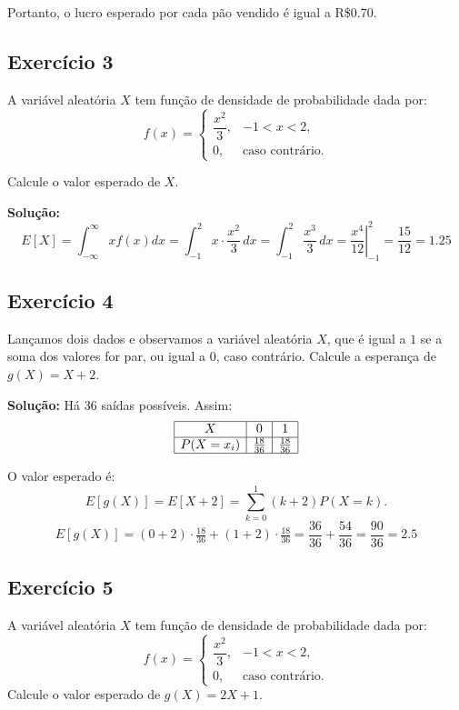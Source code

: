 \documentclass{article}
\begin{document}
Portanto, o lucro esperado por cada pão vendido é igual a R\$0.70.

\subsection{Exercício 3}
A variável aleatória $X$ tem função de densidade de probabilidade dada por:
    $$
    f(x) =
    \begin{cases}
    \dfrac{x^2}{3}, & -1 < x < 2, \\[6pt]
    0, & \text{caso contrário}.
    \end{cases}
    $$

Calcule o valor esperado de $X$.

\vspace{0.5cm}
\textbf{Solução:}
    $$
    E[X] = \int_{-\infty}^{\infty} x f(x) dx 
    = \int_{-1}^{2} x \cdot \frac{x^2}{3}\, dx
    = \int_{-1}^{2} \frac{x^3}{3}\, dx
    = \left. \frac{x^4}{12} \right|_{-1}^{2}
    = \frac{15}{12} = 1.25
    $$

\subsection{Exercício 4}
Lançamos dois dados e observamos a variável aleatória $X$, que é igual a $1$ se a soma dos valores for par, ou igual a $0$, caso contrário.  
Calcule a esperança de $g(X) = X + 2$.

\vspace{0.5cm}
\textbf{Solução:}
Há $36$ saídas possíveis. Assim:
    $$
    \begin{array}{|c|c|c|}
    \hline
    X & 0 & 1 \\
    \hline
    P(X = x_i) & \tfrac{18}{36} & \tfrac{18}{36} \\
    \hline
    \end{array}
    $$

O valor esperado é:
    $$
    E[g(X)] = E[X+2] = \sum_{k=0}^{1} (k+2) P(X=k).
    $$
    $$
    E[g(X)] = (0+2)\cdot \tfrac{18}{36} + (1+2)\cdot \tfrac{18}{36}
    = \frac{36}{36} + \frac{54}{36} = \frac{90}{36} = 2.5
    $$

\subsection{Exercício 5}
A variável aleatória $X$ tem função de densidade de probabilidade dada por:
    $$
    f(x) = 
    \begin{cases}
    \dfrac{x^2}{3}, & -1 < x < 2, \\
    0, & \text{caso contrário}.
    \end{cases}
    $$
Calcule o valor esperado de $g(X) = 2X + 1$.
\end{document}
